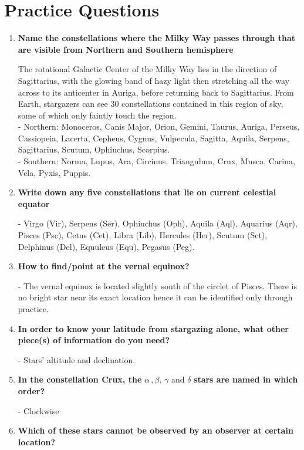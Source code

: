 \documentclass[a4paper,12pt]{extarticle}
\begin{document}
\section*{Practice Questions}
\begin{enumerate}
	\item \textbf{Name the constellations where the Milky Way passes through that are visible from Northern and Southern hemisphere}
	\begin{sol}
	The rotational Galactic Center of the Milky Way lies in the direction of Sagittarius, with the glowing band of hazy light then stretching all the way across to its anticenter in Auriga, before returning back to Sagittarius. From Earth, stargazers can see 30 constellations contained in this region of sky, some of which only faintly touch the region.\\
	
	- \textsf{Northern}: Monoceros, Canis Major, Orion, Gemini, Taurus, Auriga, Perseus, Cassiopeia, Lacerta, Cepheus, Cygnus, Vulpecula, Sagitta, Aquila, Serpens, Sagittarius, Scutum, Ophiuchus, Scorpius.\\
	
	- \textsf{Southern}: Norma, Lupus, Ara, Circinus, Triangulum, Crux, Musca, Carina, Vela, Pyxis, Puppis.
	\end{sol}

	\item \textbf{Write down any five constellations that lie on current celestial equator}
	\begin{sol}
		- Virgo (Vir), Serpens (Ser), Ophiuchus (Oph), Aquila (Aql), Aquarius (Aqr), Pisces (Psc), Cetus (Cet), Libra (Lib), Hercules (Her), Scutum (Sct), Delphinus (Del), Equuleus (Equ), Pegasus (Peg).
	\end{sol}
	\item \textbf{How to find/point at the vernal equinox?}
	\begin{sol}
		- The vernal equinox is located slightly south of the circlet of Pisces. There is no bright star near its exact location hence it can be identified only through practice.
	\end{sol}
	
	\item \textbf{In order to know your latitude from stargazing alone, what other piece(s) of information do you need?}
	\begin{sol}
	- Stars' altitude and declination.
	\end{sol}
			\item \textbf{In the constellation Crux, the} $\alpha\,, \beta, \,\gamma$ and $\delta$ \textbf{stars are named in which order?}
	\begin{sol}
		- Clockwise
	\end{sol}
	\item \textbf{Which of these stars cannot be observed by an observer at certain location?}


\end{enumerate}
\end{document}
